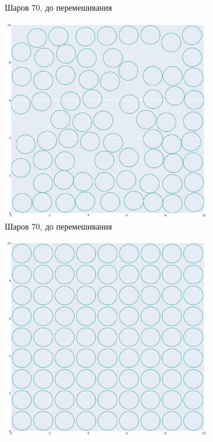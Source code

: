 \begin{enumerate}
\begin{figure}[h!]
\begin{subfigure}{0.49\textwidth}
            \caption{Шаров $70$, до перемешивания}
        \end{subfigure}
        \begin{subfigure}{0.49\textwidth}
            \centering
            \includegraphics [width=\imgsize,height=\imgsize]{figures/mesh_based/70_after_shuffeling.png}
            \caption{Шаров $70$, до перемешивания}
        \end{subfigure}
        \begin{subfigure}{0.49\textwidth}
            \centering
            \includegraphics [width=\imgsize,height=\imgsize]{figures/mesh_based/81_before_shuffeling.png}

\end{subfigure}
\end{figure}
\end{enumerate}
